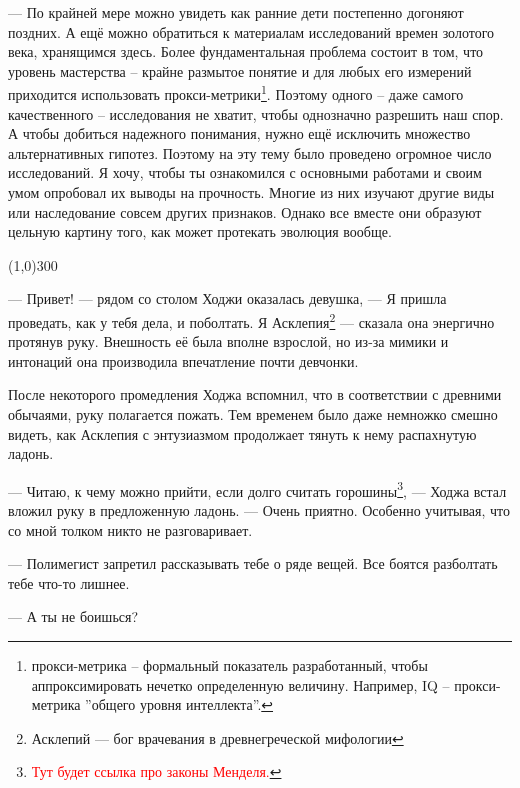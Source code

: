 \documentclass[12pt,a4paper]{article}
\newcommand{\tr}[1]{\textcolor{red}{#1}}
\newcommand{\sep}{
	\begin{center}
		\line(1,0){300}
	\end{center}
}
\begin{document}
--- По крайней мере можно увидеть как ранние дети постепенно догоняют поздних. А ещё можно обратиться к материалам исследований времен золотого века, хранящимся здесь. Более фундаментальная проблема состоит в том, что уровень мастерства -- крайне размытое понятие и для любых его измерений приходится использовать прокси-метрики\footnote{прокси-метрика -- формальный показатель разработанный, чтобы аппроксимировать нечетко определенную величину. Например, IQ -- прокси-метрика ''общего уровня интеллекта''.}. Поэтому одного -- даже самого качественного -- исследования не хватит, чтобы однозначно разрешить наш спор. А чтобы добиться надежного понимания, нужно ещё исключить множество альтернативных гипотез. Поэтому на эту тему было проведено огромное число исследований. Я хочу, чтобы ты ознакомился с основными работами и своим умом опробовал их выводы на прочность. Многие из них изучают другие виды или наследование совсем других признаков. Однако все вместе они образуют цельную картину того, как может протекать эволюция вообще.





\sep

--- Привет! --- рядом со столом Ходжи оказалась девушка, --- Я пришла проведать, как у тебя дела, и поболтать. Я Асклепия\footnote{Асклепий --- бог врачевания в древнегреческой мифологии} --- сказала она энергично протянув руку. Внешность её была вполне взрослой, но из-за мимики и интонаций она производила впечатление почти девчонки.

После некоторого промедления Ходжа вспомнил, что в соответствии с древними обычаями, руку полагается пожать. Тем временем было даже немножко смешно видеть, как Асклепия с энтузиазмом продолжает тянуть к нему распахнутую ладонь.

--- Читаю, к чему можно прийти, если долго считать горошины\footnote{\tr{Тут будет ссылка про законы Менделя.}}, --- Ходжа встал вложил руку в предложенную ладонь. --- Очень приятно. Особенно учитывая, что со мной толком никто не разговаривает.

--- Полимегист запретил рассказывать тебе о ряде вещей. Все боятся разболтать тебе что-то лишнее.

--- А ты не боишься?
\end{document}
